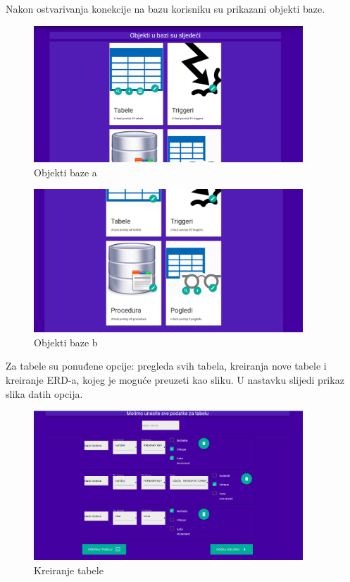 \documentclass[12pt, a4paper]{report}
\theoremstyle{definition}
\begin{document}
\newpage
Nakon ostvarivanja konekcije na bazu korisniku su prikazani objekti baze.

\begin{figure}[H]
	\begin{center} 
		\includegraphics[width=0.9\textwidth]{a5.png}
	\end{center}
	\caption{Objekti baze a}
\end{figure}
\begin{figure}[H]
	\begin{center} 
		\includegraphics[width=0.9\textwidth]{a6.png}
	\end{center}
	\caption{Objekti baze b}
\end{figure}

\newpage

Za tabele su ponuđene opcije: pregleda svih tabela, kreiranja nove tabele i kreiranje ERD-a, kojeg je moguće preuzeti kao sliku. U nastavku slijedi prikaz slika datih opcija.

\begin{figure}[H]
	\begin{center} 
		\includegraphics[width=0.9\textwidth]{a18.png}
	\end{center}
	\caption{Kreiranje tabele}
\end{figure}
\end{document}
